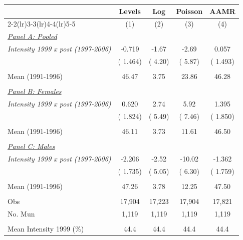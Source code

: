 \begin{tabular}{lcccc} \hline \hline
& Levels & Log & Poisson & AAMR \\ 
\cmidrule(lr){2-2}\cmidrule(lr){3-3}\cmidrule(lr){4-4}\cmidrule(lr){5-5}
& \multicolumn{1}{c}{(1)} & \multicolumn{1}{c}{(2)} & \multicolumn{1}{c}{(3)} & \multicolumn{1}{c}{(4)} \\ \toprule
\underline{\textit{Panel A: Pooled}}  \\ 
\textit{Intensity 1999 x post (1997-2006)} &       -0.719 &        -1.67 &        -2.69 &        0.057 \\ 
  & (       1.464) & (        4.20) & (        5.87) & (       1.493) \\ 
  & & & & \\ 
Mean (1991-1996)  &        46.47 &         3.75 &        23.86 &        46.28 \\ 
  & & & &  \\ 
\underline{\textit{Panel B: Females}}  \\ 
\textit{Intensity 1999 x post (1997-2006)}  &        0.620 &         2.74 &         5.92 &        1.395 \\ 
  & (       1.824) & (        5.49) & (        7.46) & (       1.850) \\ 
  & & & & \\ 
Mean (1991-1996)  &        46.11 &         3.73 &        11.61 &        46.50 \\ 
  & & & &  \\ 
\underline{\textit{Panel C: Males}}  \\ 
\textit{Intensity 1999 x post (1997-2006)} &       -2.206 &        -2.52 &       -10.02 &       -1.362 \\ 
  & (       1.735) & (        5.05) & (        6.30) & (       1.759) \\ 
  & & & & \\ 
Mean (1991-1996) &        47.26 &         3.78 &        12.25 &        47.50 \\ 
  & & & &  \\ 
Obs &       17,904 &       17,223 &       17,904 &       17,821 \\ 
No. Mun &        1,119 &        1,119 &        1,119 &        1,119 \\ 
  & & & & \\ 
Mean Intensity 1999 (\%) &   44.4 &   44.4 &   44.4 &   44.4 \\ 
\bottomrule
\end{tabular}